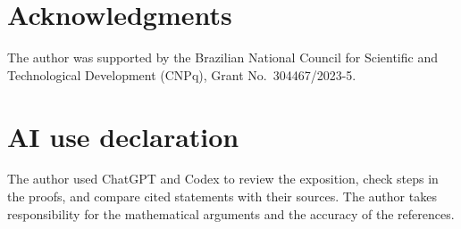 \documentclass[11pt,reqno]{amsart}
\theoremstyle{definition}
\theoremstyle{plain}
\theoremstyle{definition}
\theoremstyle{remark}
\begin{document}
\section*{Acknowledgments}
The author was supported by the Brazilian National Council for
Scientific and Technological Development (CNPq), Grant
No.~304467/2023-5.

\section*{AI use declaration}

The author used ChatGPT and Codex to review the exposition, check
steps in the proofs, and compare cited statements with their sources.
The author takes responsibility for the mathematical arguments and
the accuracy of the references.
\end{document}
